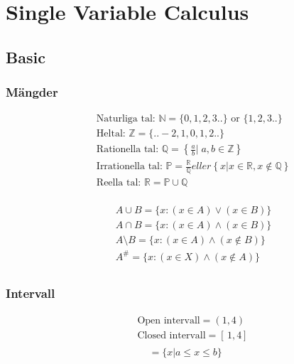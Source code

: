 \chapter{Single Variable Calculus}

\newpage

\section{Basic}
\subsection{Mängder}
\begin{align*}
  &\quad \text{Naturliga tal: } \mathbb{N} = \{0, 1, 2 , 3 ..  \} \text{ or } \{1, 2 , 3 ..  \} \\
  &\quad \text{Heltal: }\mathbb{Z} = \{.. -2, 1, 0, 1, 2 ..  \} \\
  &\quad \text{Rationella tal: }\mathbb{Q} = \left\{ \frac{a}{b} \Big| \; a,b \in \mathbb{Z} \right\} \\
  &\quad \text{Irrationella tal: }\mathbb{P} = \frac{\mathbb{R}}{\mathbb{Q}}eller \left\{ x | x \in \mathbb{R}, x \notin \mathbb{Q} \right\} \\
  &\quad \text{Reella tal: }\mathbb{R} =  \mathbb{P} \cup \mathbb{Q} \\
\end{align*}

\begin{align*}
  &\quad A \cup B = \{ x:(x \in A) \lor (x \in B)\} \\
  &\quad A \cap B = \{ x:(x \in A) \land (x \in B)\} \\
  &\quad A \setminus B = \{ x:(x \in A) \land (x \notin B)\} \\
  &\quad A^{\text{\#}} = \{ x:(x \in X) \land (x \notin A)\} \\
\end{align*}


\newpage

\subsection{Intervall}
\begin{align*}
  &\quad \text{Open intervall} = (1,4) \\
  &\quad \text{Closed intervall} = [ \, 1,4 ] \, \\
\end{align*}
\begin{equation}
[ \, a, b ] \, = \{ x | a \leq x \leq b \}
\end{equation}

